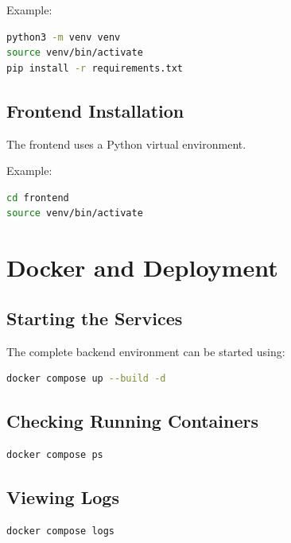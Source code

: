 \documentclass[12pt,a4paper]{article}
\begin{document}
Example:

\begin{lstlisting}[language=bash]
python3 -m venv venv
source venv/bin/activate
pip install -r requirements.txt
\end{lstlisting}

\subsection{Frontend Installation}

The frontend uses a Python virtual environment.

Example:

\begin{lstlisting}[language=bash]
cd frontend
source venv/bin/activate
\end{lstlisting}


\section{Docker and Deployment}

\subsection{Starting the Services}

The complete backend environment can be started using:

\begin{lstlisting}[language=bash]
docker compose up --build -d
\end{lstlisting}

\subsection{Checking Running Containers}

\begin{lstlisting}[language=bash]
docker compose ps
\end{lstlisting}

\subsection{Viewing Logs}

\begin{lstlisting}[language=bash]
docker compose logs
\end{lstlisting}
\end{document}
